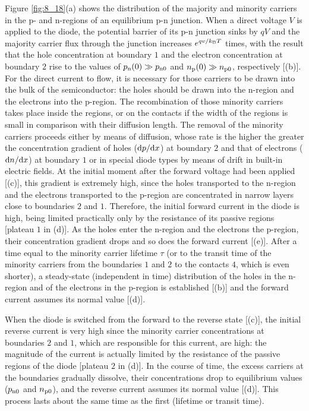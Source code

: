 Figure \ref{fig:8_18}(a) shows the distribution of the majority and minority carriers in the p- and n-regions of an equilibrium p-n junction. When a direct voltage $V$ is applied to the diode, the potential barrier of its p-n junction sinks by $qV$ and the majority carrier flux through the junction increases $e^{qv/k_{\text{B}}T}$ times, with the result that the hole concentration at boundary $1$ and the electron concentration at boundary $2$ rise to the values of $p_{\text{n}}(0)\gg p_{\text{n$0$}}$ and $n_{\text{p}}(0)\gg n_{\text{p$0$}}$, respectively [(b)].
For the direct current to flow, it is necessary for those carriers to be drawn into the bulk of the semiconductor: the holes should be drawn into the n-region and the electrons into the p-region. The recombination of those minority carriers takes place inside the regions, or on the contacts if the width of the regions is small in comparison with their diffusion length. The removal of the minority carriers proceeds either by means of diffusion, whose rate is the higher the greater the concentration gradient of holes ($\mathrm{d} p/\mathrm{d} x$) at boundary $2$ and that of electrons ($\mathrm{d} n/\mathrm{d} x$) at boundary $1$ or in special diode types by means of drift in built-in electric fields. At the initial moment after the forward voltage had been applied
[(c)], this gradient is extremely high, since the holes transported to the n-region and the electrons transported to the p-region are concentrated in narrow layers close to boundaries $2$ and $1$. Therefore, the initial forward current in the diode is high, being limited practically only by the resistance of its passive regions [plateau $1$
in (d)]. As the holes enter the n-region and the electrons the p-region, their concentration gradient drops and so does the forward current [(e)]. After a time equal to the minority
carrier lifetime $\tau$ (or to the transit time of the minority carriers from the boundaries $1$ and $2$ to the contacts $4$, which is even shorter), a steady-state (independent in time) distribution of the holes in the n-region and of the electrons in the p-region is established [(b)] and the forward current assumes its normal value [(d)].

When the diode is switched from the forward to the reverse state [(c)], the initial reverse current is very high since the minority carrier concentrations at boundaries $2$ and $1$, which are
responsible for this current, are high: the magnitude of the current is actually limited by the resistance of the passive regions of the diode [plateau $2$ in (d)]. In the course of time, the excess carriers at the boundaries gradually dissolve, their concentrations drop to equilibrium values ($p_{\text{n$0$}}$ and $n_{\text{p$0$}}$), and the reverse current assumes its normal value [(d)]. This process lasts about the same time as the first (lifetime or transit time).

